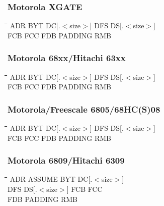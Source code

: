 \subsubsection{Motorola XGATE}
{\tt\begin{tabbing}
\hspace{3cm}\=\hspace{3cm}\=\hspace{3cm}\=\hspace{3cm}\=\kill
ADR        \> BYT         \> DC[.$<$size$>$] \> DFS     \> DS[.$<$size$>$]
\\
FCB        \> FCC         \> FDB         \> PADDING     \> RMB \\
\end{tabbing}}

\subsubsection{Motorola 68xx/Hitachi 63xx}
{\tt\begin{tabbing}
\hspace{3cm}\=\hspace{3cm}\=\hspace{3cm}\=\hspace{3cm}\=\kill
ADR        \> BYT         \> DC[.$<$size$>$] \> DFS     \> DS[.$<$size$>$] \\
FCB        \> FCC         \> FDB         \> PADDING     \> RMB \\
\end{tabbing}}

\subsubsection{Motorola/Freescale 6805/68HC(S)08}
{\tt\begin{tabbing}
\hspace{3cm}\=\hspace{3cm}\=\hspace{3cm}\=\hspace{3cm}\=\kill
ADR        \> BYT         \> DC[.$<$size$>$] \> DFS     \> DS[.$<$size$>$] \\
FCB        \> FCC         \> FDB         \> PADDING     \> RMB \\
\end{tabbing}}

\subsubsection{Motorola 6809/Hitachi 6309}
{\tt\begin{tabbing}
\hspace{3cm}\=\hspace{3cm}\=\hspace{3cm}\=\hspace{3cm}\=\kill
ADR        \> ASSUME      \> BYT         \> DC[.$<$size$>$] \\
DFS        \> DS[.$<$size$>$] \> FCB     \> FCC \\
FDB         \> PADDING     \> RMB \\
\end{tabbing}}

